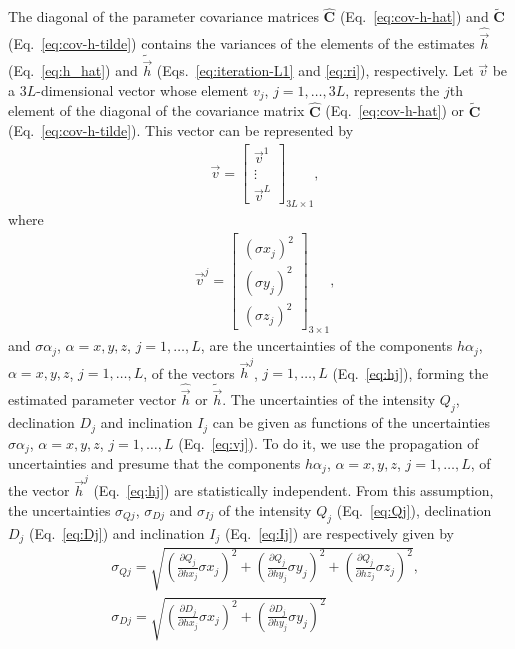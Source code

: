 \documentclass[journal abbreviation, npg]{copernicus}
\begin{document}
The diagonal of the parameter covariance matrices $\hat{\mathbf{C}}$
(Eq.~\ref{eq:cov-h-hat}) and $\tilde{\mathbf{C}}$ (Eq.~\ref{eq:cov-h-tilde})
contains the variances of the elements of the estimates $\hat{\vec{h}}$
(Eq.~\ref{eq:h_hat}) and $\tilde{\vec{h}}$ (Eqs.~\ref{eq:iteration-L1} and
\ref{eq:ri}), respectively. Let $\vec{v}$ be a $3L$-dimensional vector whose
element $v_{j}$, $j = 1, \ldots, 3L$, represents the $j$th element of the
diagonal of the covariance matrix $\hat{\mathbf{C}}$ (Eq.~\ref{eq:cov-h-hat})
or $\tilde{\mathbf{C}}$ (Eq.~\ref{eq:cov-h-tilde}). This vector can be
represented by
\begin{align}
 &
\vec{v} =
\begin{bmatrix}
\vec{v}^{1} \\
\vdots \\
\vec{v}^{L}
\end{bmatrix}
_{3L \times 1} ,
\label{eq:v}
\end{align}
where
\begin{align}
 &
\vec{v}^{j} =
\begin{bmatrix}
\left(\sigma x_{j} \right)^{2} \\
\left(\sigma y_{j} \right)^{2} \\
\left(\sigma z_{j} \right)^{2}
\end{bmatrix}
_{3 \times 1} ,
\label{eq:vj}
\end{align}
and ${\sigma \alpha}_{j}$, $\alpha = x, y, z$, $j = 1, \ldots, L$, are the
uncertainties of the components ${h \alpha}_{j}$, $\alpha = x, y, z$, $j = 1,
\ldots, L$, of the vectors $\vec{h}^{j}$, $j = 1, \ldots, L$
(Eq.~\ref{eq:hj}), forming the estimated parameter vector $\hat{\vec{h}}$ or
$\tilde{\vec{h}}$. The uncertainties of the intensity $Q_{j}$, declination
$D_{j}$ and inclination $I_{j}$ can be given as functions of the
uncertainties ${\sigma \alpha}_{j}$, $\alpha = x, y, z$, $j = 1, \ldots, L$
(Eq.~\ref{eq:vj}). To do it, we use the propagation of uncertainties
\citep{fornasini2008} and presume that the components ${h \alpha}_{j}$,
$\alpha = x, y, z$, $j = 1, \ldots, L$, of the vector $\vec{h}^{j}$
(Eq.~\ref{eq:hj}) are statistically independent. From this assumption, the
uncertainties $\sigma_{Qj}$, $\sigma_{Dj}$ and $\sigma_{Ij}$ of the intensity
$Q_{j}$ (Eq.~\ref{eq:Qj}), declination $D_{j}$ (Eq.~\ref{eq:Dj}) and
inclination $I_{j}$ (Eq.~\ref{eq:Ij}) are respectively given by
\begin{align}
 &
\sigma_{Qj} = \sqrt{\left(\frac{\partial Q_{j}}{\partial hx_{j}}  \sigma x_{j} \right)^{2} +
                    \left(\frac{\partial Q_{j}}{\partial hy_{j}}  \sigma y_{j} \right)^{2} +
                    \left(\frac{\partial Q_{j}}{\partial hz_{j}}  \sigma z_{j} \right)^{2}} ,
\label{eq:sigmaQj}
\\
&
\sigma_{Dj} = \sqrt{\left(\frac{\partial D_{j}}{\partial hx_{j}}  \sigma x_{j} \right)^{2} +
                    \left(\frac{\partial D_{j}}{\partial hy_{j}}  \sigma y_{j} \right)^{2}}
\label{eq:sigmaDj}
\end{align}
\end{document}
